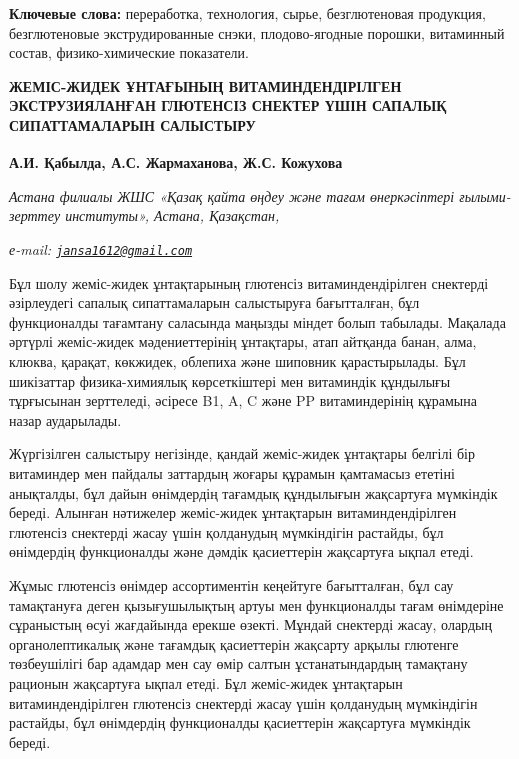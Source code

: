 {\bfseries Ключевые слова:} переработка, технология, сырье, безглютеновая
продукция, безглютеновые экструдированные снэки, плодово-ягодные
порошки, витаминный состав, физико-химические показатели.

\begin{articleheader}
{\bfseries ЖЕМІС-ЖИДЕК ҰНТАҒЫНЫҢ ВИТАМИНДЕНДІРІЛГЕН ЭКСТРУЗИЯЛАНҒАН ГЛЮТЕНСІЗ СНЕКТЕР ҮШІН САПАЛЫҚ СИПАТТАМАЛАРЫН САЛЫСТЫРУ}

{\bfseries
А.И. Қабылда,
А.С. Жармаханова,
Ж.С. Кожухова\textsuperscript{\envelope }}
\end{articleheader}

\begin{affiliation}
\emph{Астана филиалы ЖШС «Қазақ қайта өңдеу және тағам өнеркәсіптері ғылыми-зерттеу институты», Астана, Қазақстан,}

\emph{е-mail: \href{mailto:jansa1612@gmail.com}{\nolinkurl{jansa1612@gmail.com}}}
\end{affiliation}

Бұл шолу жеміс-жидек ұнтақтарының глютенсіз витаминдендірілген снектерді
әзірлеудегі сапалық сипаттамаларын салыстыруға бағытталған, бұл
функционалды тағамтану саласында маңызды міндет болып табылады. Мақалада
әртүрлі жеміс-жидек мәдениеттерінің ұнтақтары, атап айтқанда банан,
алма, клюква, қарақат, көкжидек, облепиха және шиповник қарастырылады.
Бұл шикізаттар физика-химиялық көрсеткіштері мен витаминдік құндылығы
тұрғысынан зерттеледі, әсіресе B1, A, C және PP витаминдерінің құрамына
назар аударылады.

Жүргізілген салыстыру негізінде, қандай жеміс-жидек ұнтақтары белгілі
бір витаминдер мен пайдалы заттардың жоғары құрамын қамтамасыз ететіні
анықталды, бұл дайын өнімдердің тағамдық құндылығын жақсартуға мүмкіндік
береді. Алынған нәтижелер жеміс-жидек ұнтақтарын витаминдендірілген
глютенсіз снектерді жасау үшін қолданудың мүмкіндігін растайды, бұл
өнімдердің функционалды және дәмдік қасиеттерін жақсартуға ықпал етеді.

Жұмыс глютенсіз өнімдер ассортиментін кеңейтуге бағытталған, бұл сау
тамақтануға деген қызығушылықтың артуы мен функционалды тағам өнімдеріне
сұраныстың өсуі жағдайында ерекше өзекті. Мұндай снектерді жасау,
олардың органолептикалық және тағамдық қасиеттерін жақсарту арқылы
глютенге төзбеушілігі бар адамдар мен сау өмір салтын ұстанатындардың
тамақтану рационын жақсартуға ықпал етеді. Бұл жеміс-жидек ұнтақтарын
витаминдендірілген глютенсіз снектерді жасау үшін қолданудың мүмкіндігін
растайды, бұл өнімдердің функционалды қасиеттерін жақсартуға мүмкіндік
береді.

